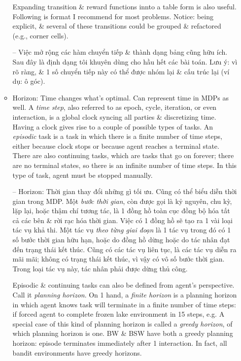 \documentclass{article}
\begin{document}
\begin{itemize}
\begin{itemize}
        Expanding transition \& reward functions innto a table form is also useful. Following is format I recommend for most problems. Notice: being explicit, \& several of these transitions could be grouped \& refactored (e.g., corner cells).

        -- Việc mở rộng các hàm chuyển tiếp \& thành dạng bảng cũng hữu ích. Sau đây là định dạng tôi khuyên dùng cho hầu hết các bài toán. Lưu ý: vì rõ ràng, \& 1 số chuyển tiếp này có thể được nhóm lại \& cấu trúc lại (ví dụ: ô góc).
        \item {\sf Horizon: Time changes what's optimal.} Can represent time in MDPs as well. A {\it time step}, also referred to as epoch, cycle, iteration, or even interaction, is a global clock syncing all parties \& discretizing time. Having a clock gives rise to a couple of possible types of tasks. An {\it episodic} task is a task in which there is a finite number of time steps, either because clock stops or because agent reaches a terminal state. There are also continuing tasks, which are tasks that go on forever; there are no terminal states, so there is an infinite number of time steps. In this type of task, agent must be stopped manually.

        -- {\sf Horizon: Thời gian thay đổi những gì tối ưu.} Cũng có thể biểu diễn thời gian trong MDP. Một {\it bước thời gian}, còn được gọi là kỷ nguyên, chu kỳ, lặp lại, hoặc thậm chí tương tác, là 1 đồng hồ toàn cục đồng bộ hóa tất cả các bên \& rời rạc hóa thời gian. Việc có 1 đồng hồ sẽ tạo ra 1 vài loại tác vụ khả thi. Một tác vụ {\it theo từng giai đoạn} là 1 tác vụ trong đó có 1 số bước thời gian hữu hạn, hoặc do đồng hồ dừng hoặc do tác nhân đạt đến trạng thái kết thúc. Cũng có các tác vụ liên tục, là các tác vụ diễn ra mãi mãi; không có trạng thái kết thúc, vì vậy có vô số bước thời gian. Trong loại tác vụ này, tác nhân phải được dừng thủ công.

        Episodic \& continuing tasks can also be defined from agent's perspective. Call it {\it planning horizon}. On 1 hand, a {\it finite horizon} is a planning horizon in which agent knows task will terminate in a finite number of time steps: if forced agent to complete frozen lake environment in 15 steps, e.g. A special case of this kind of planning horizon is called a {\it greedy horizon}, of which planning horizon is one. BW \& BSW have both a greedy planning horizon: episode terminates immediately after 1 interaction. In fact, all bandit environments have greedy horizons.


\end{itemize}
\end{itemize}
\end{document}
